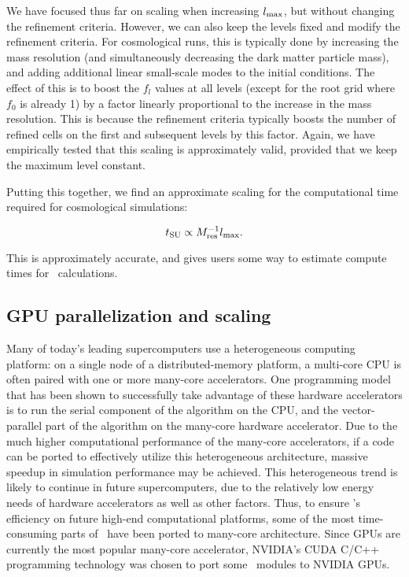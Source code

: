 We have focused thus far on scaling when increasing $l_{\rm max}$, but
without changing the refinement criteria.  However, we can also keep
the levels fixed and modify the refinement criteria.  For cosmological
runs, this is typically done by increasing the mass resolution (and
simultaneously decreasing the dark matter particle mass), and adding
additional linear small-scale modes to the initial conditions.  The
effect of this is to boost the $f_l$ values at all levels (except for
the root grid where $f_0$ is already 1) by a factor linearly
proportional to the increase in the mass resolution.  This is because
the refinement criteria typically boosts the number of refined cells
on the first and subsequent levels by this factor.  Again, we have
empirically tested that this scaling is approximately valid, provided
that we keep the maximum level constant.

Putting this together, we find an approximate scaling for the
computational time required for cosmological simulations:

\begin{equation}
t_{\rm SU} \propto M_{\rm res}^{-1} l_{\rm max}.
\end{equation}

This is approximately accurate, and gives users some way to estimate
compute times for \enzo\ calculations.  

\subsection{GPU parallelization and scaling}

Many of today's leading supercomputers use a heterogeneous
computing platform:
on a single node of a distributed-memory platform, a multi-core CPU is
often paired with one or more many-core accelerators.  One programming
model that has been shown to successfully take advantage of these
hardware accelerators is to run the serial component of the algorithm
on the CPU, and the vector-parallel part of the algorithm on the
many-core hardware accelerator. Due to the much higher computational
performance of the many-core accelerators, if a code can be ported to
effectively utilize this heterogeneous architecture, massive speedup
in simulation performance may be achieved.  This heterogeneous trend
is likely to continue in future supercomputers, due to the relatively
low energy needs of hardware accelerators as well as other
factors. Thus, to ensure \enzo's efficiency on future high-end
computational platforms, some of the most time-consuming parts of
\enzo\ have been ported to many-core architecture.  Since GPUs are
currently the most popular many-core accelerator, NVIDIA's CUDA C/C++
programming technology was chosen to port some \enzo\ modules to
NVIDIA GPUs.


